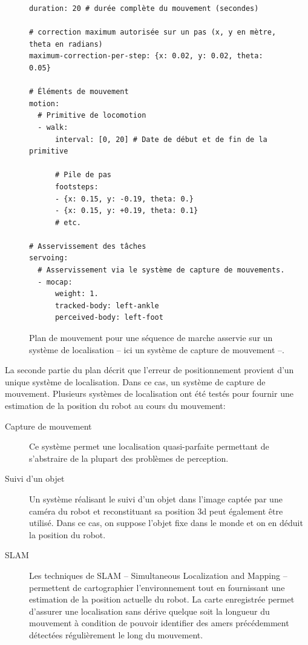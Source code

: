 \begin{figure}
  \begin{center}
\begin{verbatim}
duration: 20 # durée complète du mouvement (secondes)

# correction maximum autorisée sur un pas (x, y en mètre, theta en radians)
maximum-correction-per-step: {x: 0.02, y: 0.02, theta: 0.05}

# Éléments de mouvement
motion:
  # Primitive de locomotion
  - walk:
      interval: [0, 20] # Date de début et de fin de la primitive

      # Pile de pas
      footsteps:
      - {x: 0.15, y: -0.19, theta: 0.}
      - {x: 0.15, y: +0.19, theta: 0.1}
      # etc.

# Asservissement des tâches
servoing:
  # Asservissement via le système de capture de mouvements.
  - mocap:
      weight: 1.
      tracked-body: left-ankle
      perceived-body: left-foot
\end{verbatim}
  \end{center}
  \caption{Plan de mouvement pour une séquence de marche asservie sur
    un système de localisation -- ici un système de capture de
    mouvement --.\label{fig:plan_locomotion_asservie}}
\end{figure}

La seconde partie du plan décrit que l'erreur de positionnement
provient d'un unique système de localisation. Dans ce cas, un système
de capture de mouvement. Plusieurs systèmes de localisation ont été
testés pour fournir une estimation de la position du robot au cours du
mouvement:

\begin{description}
\item[Capture de mouvement] Ce système permet une localisation
  quasi-parfaite permettant de s'abstraire de la plupart des problèmes
  de perception.
\item[Suivi d'un objet] Un système réalisant le suivi d'un objet dans
  l'image captée par une caméra du robot et reconstituant sa position
  3d peut également être utilisé. Dans ce cas, on suppose l'objet fixe
  dans le monde et on en déduit la position du robot.
\item[SLAM] Les techniques de SLAM -- Simultaneous Localization and
  Mapping -- permettent de cartographier l'environnement tout en
  fournissant une estimation de la position actuelle du robot. La
  carte enregistrée permet d'assurer une localisation sans dérive
  quelque soit la longueur du mouvement à condition de pouvoir
  identifier des amers précédemment détectées régulièrement le long
  du mouvement.
\end{description}

